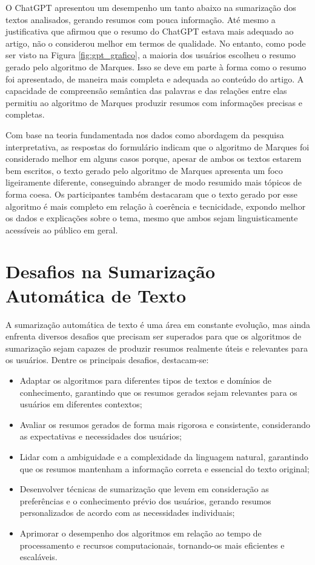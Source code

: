 O ChatGPT apresentou um desempenho um tanto abaixo na sumarização dos textos analisados, gerando resumos com pouca informação. Até mesmo a justificativa que afirmou que o resumo do ChatGPT estava mais adequado ao artigo, não o considerou melhor em termos de qualidade. No entanto, como pode ser visto na Figura \ref{fig:gpt_grafico}, a maioria dos usuários escolheu o resumo gerado pelo algoritmo de Marques. Isso se deve em parte à forma como o resumo foi apresentado, de maneira mais completa e adequada ao conteúdo do artigo. A capacidade de compreensão semântica das palavras e das relações entre elas permitiu ao algoritmo de Marques produzir resumos com informações precisas e completas.

Com base na teoria fundamentada nos dados como abordagem da pesquisa interpretativa, as respostas do formulário indicam que o algoritmo de Marques foi considerado melhor em alguns casos porque, apesar de ambos os textos estarem bem escritos, o texto gerado pelo algoritmo de Marques apresenta um foco ligeiramente diferente, conseguindo abranger de modo resumido mais tópicos de forma coesa. Os participantes também destacaram que o texto gerado por esse algoritmo é mais completo em relação à coerência e tecnicidade, expondo melhor os dados e explicações sobre o tema, mesmo que ambos sejam linguisticamente acessíveis ao público em geral.

\section{Desafios na Sumarização Automática de Texto}

A sumarização automática de texto é uma área em constante evolução, mas ainda enfrenta diversos desafios que precisam ser superados para que os algoritmos de sumarização sejam capazes de produzir resumos realmente úteis e relevantes para os usuários. Dentre os principais desafios, destacam-se:

\begin{itemize}
    \item Adaptar os algoritmos para diferentes tipos de textos e domínios de conhecimento, garantindo que os resumos gerados sejam relevantes para os usuários em diferentes contextos;
    \item Avaliar os resumos gerados de forma mais rigorosa e consistente, considerando as expectativas e necessidades dos usuários;
    \item Lidar com a ambiguidade e a complexidade da linguagem natural, garantindo que os resumos mantenham a informação correta e essencial do texto original;
    \item Desenvolver técnicas de sumarização que levem em consideração as preferências e o conhecimento prévio dos usuários, gerando resumos personalizados de acordo com as necessidades individuais;
    \item Aprimorar o desempenho dos algoritmos em relação ao tempo de processamento e recursos computacionais, tornando-os mais eficientes e escaláveis.
\end{itemize}

